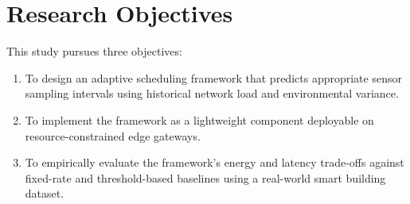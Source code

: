 \section{Research Objectives}

This study pursues three objectives:
\begin{enumerate}[label=RO\arabic*.]
  \item To design an adaptive scheduling framework that predicts appropriate sensor sampling
        intervals using historical network load and environmental variance.
  \item To implement the framework as a lightweight component deployable on resource-constrained
        edge gateways.
  \item To empirically evaluate the framework's energy and latency trade-offs against fixed-rate
        and threshold-based baselines using a real-world smart building dataset.
\end{enumerate}
